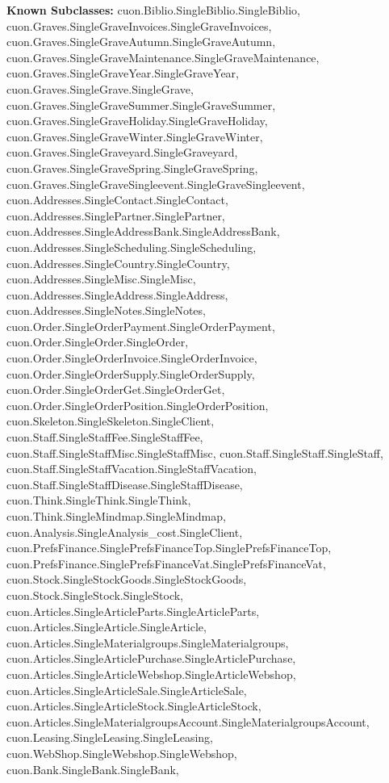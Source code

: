 \textbf{Known Subclasses:}
cuon.Biblio.SingleBiblio.SingleBiblio,
    cuon.Graves.SingleGraveInvoices.SingleGraveInvoices,
    cuon.Graves.SingleGraveAutumn.SingleGraveAutumn,
    cuon.Graves.SingleGraveMaintenance.SingleGraveMaintenance,
    cuon.Graves.SingleGraveYear.SingleGraveYear,
    cuon.Graves.SingleGrave.SingleGrave,
    cuon.Graves.SingleGraveSummer.SingleGraveSummer,
    cuon.Graves.SingleGraveHoliday.SingleGraveHoliday,
    cuon.Graves.SingleGraveWinter.SingleGraveWinter,
    cuon.Graves.SingleGraveyard.SingleGraveyard,
    cuon.Graves.SingleGraveSpring.SingleGraveSpring,
    cuon.Graves.SingleGraveSingleevent.SingleGraveSingleevent,
    cuon.Addresses.SingleContact.SingleContact,
    cuon.Addresses.SinglePartner.SinglePartner,
    cuon.Addresses.SingleAddressBank.SingleAddressBank,
    cuon.Addresses.SingleScheduling.SingleScheduling,
    cuon.Addresses.SingleCountry.SingleCountry,
    cuon.Addresses.SingleMisc.SingleMisc,
    cuon.Addresses.SingleAddress.SingleAddress,
    cuon.Addresses.SingleNotes.SingleNotes,
    cuon.Order.SingleOrderPayment.SingleOrderPayment,
    cuon.Order.SingleOrder.SingleOrder,
    cuon.Order.SingleOrderInvoice.SingleOrderInvoice,
    cuon.Order.SingleOrderSupply.SingleOrderSupply,
    cuon.Order.SingleOrderGet.SingleOrderGet,
    cuon.Order.SingleOrderPosition.SingleOrderPosition,
    cuon.Skeleton.SingleSkeleton.SingleClient,
    cuon.Staff.SingleStaffFee.SingleStaffFee,
    cuon.Staff.SingleStaffMisc.SingleStaffMisc,
    cuon.Staff.SingleStaff.SingleStaff,
    cuon.Staff.SingleStaffVacation.SingleStaffVacation,
    cuon.Staff.SingleStaffDisease.SingleStaffDisease,
    cuon.Think.SingleThink.SingleThink,
    cuon.Think.SingleMindmap.SingleMindmap,
    cuon.Analysis.SingleAnalysis\_cost.SingleClient,
    cuon.PrefsFinance.SinglePrefsFinanceTop.SinglePrefsFinanceTop,
    cuon.PrefsFinance.SinglePrefsFinanceVat.SinglePrefsFinanceVat,
    cuon.Stock.SingleStockGoods.SingleStockGoods,
    cuon.Stock.SingleStock.SingleStock,
    cuon.Articles.SingleArticleParts.SingleArticleParts,
    cuon.Articles.SingleArticle.SingleArticle,
    cuon.Articles.SingleMaterialgroups.SingleMaterialgroups,
    cuon.Articles.SingleArticlePurchase.SingleArticlePurchase,
    cuon.Articles.SingleArticleWebshop.SingleArticleWebshop,
    cuon.Articles.SingleArticleSale.SingleArticleSale,
    cuon.Articles.SingleArticleStock.SingleArticleStock,
    cuon.Articles.SingleMaterialgroupsAccount.SingleMaterialgroupsAccount,
    cuon.Leasing.SingleLeasing.SingleLeasing,
    cuon.WebShop.SingleWebshop.SingleWebshop,
    cuon.Bank.SingleBank.SingleBank,
